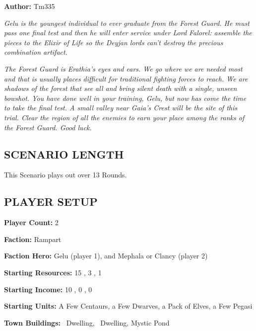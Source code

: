 \cleardoublepage{}

\begin{multicols*}{2}

\textbf{Author:} Tm335

\textit{Gelu is the youngest individual to ever graduate from the Forest Guard.
  He must pass one final test and then he will enter service under Lord Falorel: assemble the pieces to the Elixir of Life so the Deyjan lords can't destroy the precious combination artifact.
}

\textit{The Forest Guard is Erathia’s eyes and ears.
  We go where we are needed most and that is usually places difficult for traditional fighting forces to reach.
  We are shadows of the forest that see all and bring silent death with a single, unseen bowshot.
  You have done well in your training, Gelu, but now has come the time to take the final test.
  A small valley near Gaia's Crest will be the site of this trial.
  Clear the region of all the enemies to earn your place among the ranks of the Forest Guard.
  Good luck.
}

\subsection*{\MakeUppercase{Scenario Length}}

This Scenario plays out over 13 Rounds.

\subsection*{\MakeUppercase{Player Setup}}

\textbf{Player Count:} 2

\textbf{Faction:} Rampart

\textbf{Faction Hero:} Gelu (player 1), and Mephala or Clancy (player 2)

\textbf{Starting Resources:} 15 , 3 , 1 

\textbf{Starting Income:} 10 , 0 , 0 

\textbf{Starting Units:} A Few Centaurs, a Few Dwarves, a Pack of Elves, a Few Pegasi

\textbf{Town Buildings:} \bronze\ Dwelling, \silver\ Dwelling, Mystic Pond


\end{multicols*}
